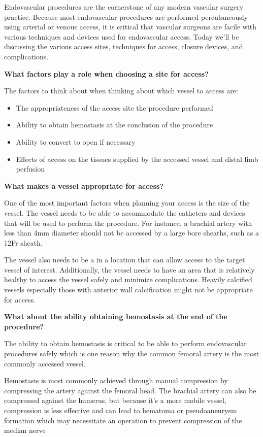 \documentclass[
]{book}
\begin{document}
Endovascular procedures are the cornerstone of any modern vascular
surgery practice. Because most endovascular procedures are performed
percutaneously using arterial or venous access, it is critical that
vascular surgeons are facile with various techniques and devices used
for endovascular access. Today we'll be discussing the various access
sites, techniques for access, closure devices, and complications.

\textbf{What factors play a role when choosing a site for access?}

The factors to think about when thinking about which vessel to access
are:

\begin{itemize}
\item
  The appropriateness of the access site the procedure performed
\item
  Ability to obtain hemostasis at the conclusion of the procedure
\item
  Ability to convert to open if necessary
\item
  Effects of access on the tissues supplied by the accessed vessel and
  distal limb perfusion
\end{itemize}

\textbf{What makes a vessel appropriate for access?}

One of the most important factors when planning your access is the size
of the vessel. The vessel needs to be able to accommodate the catheters
and devices that will be used to perform the procedure. For instance, a
brachial artery with less than 4mm diameter should not be accessed by a
large bore sheaths, such as a 12Fr sheath.

The vessel also needs to be a in a location that can allow access to the
target vessel of interest. Additionally, the vessel needs to have an
area that is relatively healthy to access the vessel safely and minimize
complications. Heavily calcified vessels especially those with anterior
wall calcification might not be appropriate for access.

\textbf{What about the ability obtaining hemostasis at the end of the
procedure?}

The ability to obtain hemostasis is critical to be able to perform
endovascular procedures safely which is one reason why the common
femoral artery is the most commonly accessed vessel.

Hemostasis is most commonly achieved through manual compression by
compressing the artery against the femoral head. The brachial artery can
also be compressed against the humerus, but because it's a more mobile
vessel, compression is less effective and can lead to hematoma or
pseudoaneurysm formation which may necessitate an operation to prevent
compression of the median nerve
\end{document}
